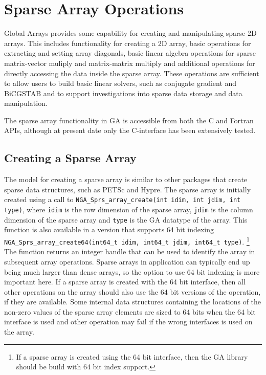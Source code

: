 \chapter{Sparse Array Operations}

Global Arrays provides some capability for creating and manipulating sparse 2D
arrays. This includes functionality for creating a 2D array, basic operations
for extracting and setting array diagonals, basic linear algebra operations for
sparse matrix-vector muliply and matrix-matrix multiply and additional
operations for directly accessing the data inside the sparse array. These
operations are sufficient to allow users to build basic linear solvers, such as
conjugate gradient and BiCGSTAB and to support investigations into sparse data
storage and data manipulation.

The sparse array functionality in GA is accessible from both the C and Fortran
APIs, although at present date only the C-interface has been extensively tested.

\section{Creating a Sparse Array}
The model for creating a sparse array is similar to other packages that create
sparse data structures, such as PETSc and Hypre. The sparse array is initially
created using a call to \texttt{NGA\_Sprs\_array\_create(int idim, int jdim, int
type)}, where \texttt{idim} is the row dimension of the sparse array,
\texttt{jdim} is the column dimension of the sparse array and \texttt{type} is
the GA datatype of the array. This function is also available in a version that
supports 64 bit indexing \texttt{NGA\_Sprs\_array\_create64(int64\_t idim,
int64\_t jdim, int64\_t type)}.  \footnote{If a sparse array is created using the
64 bit interface, then the GA library should be build with 64 bit index support.}
The function returns an integer handle that can be used to identify the array
in subsequent array operations.  Sparse arrays in application can typically end
up being
much larger than dense arrays, so the option to use 64 bit indexing is more
important here. If a sparse array is created with the 64 bit interface, then all
other operations on the array should also use the 64 bit versions of the
operation, if they are available. Some internal data structures containing the
locations of the non-zero values of the sparse array elements are sized to 64
bits when the 64 bit interface is used and other operation may fail if the wrong
interfaces is used on the array.
 
